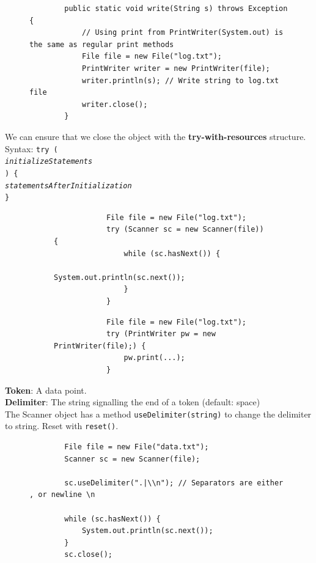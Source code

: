 \documentclass{article}
\begin{document}
\begin{figure}[h]
	\begin{verbatim}
		public static void write(String s) throws Exception {
		    // Using print from PrintWriter(System.out) is the same as regular print methods
		    File file = new File("log.txt");
		    PrintWriter writer = new PrintWriter(file);
		    writer.println(s); // Write string to log.txt file
		    writer.close();
		}
	\end{verbatim}
\end{figure}

We can ensure that we close the object with the \textbf{try-with-resources} structure.\\
Syntax:
\texttt{try (\\
\hspace*{2em}\textit{initializeStatements}\\
) \{\\
\hspace*{2em}\textit{statementsAfterInitialization}\\
\}}

\begin{figure}[h!]
	\centering
	\begin{subfigure}[h]{.49\textwidth}
		\begin{verbatim}
			File file = new File("log.txt");
			try (Scanner sc = new Scanner(file)) {
			    while (sc.hasNext()) {
			        System.out.println(sc.next());
			    }
			}
		\end{verbatim}
	\end{subfigure}
	\begin{subfigure}[h]{.49\textwidth}
		\begin{verbatim}
			File file = new File("log.txt");
			try (PrintWriter pw = new PrintWriter(file);) {
			    pw.print(...);
			}
		\end{verbatim}
	\end{subfigure}
\end{figure}

\newpage

\textbf{Token}: A data point.\\
\textbf{Delimiter}: The string signalling the end of a token (default: space)\\
The Scanner object has a method \texttt{useDelimiter(string)} to change the delimiter to string. Reset with \texttt{reset()}.

\begin{figure}[h]
	\begin{verbatim}
		File file = new File("data.txt");
		Scanner sc = new Scanner(file);
		
		sc.useDelimiter(".|\\n"); // Separators are either , or newline \n
		
		while (sc.hasNext()) {
		    System.out.println(sc.next());
		}
		sc.close();
	\end{verbatim}
\end{figure}
\end{document}
